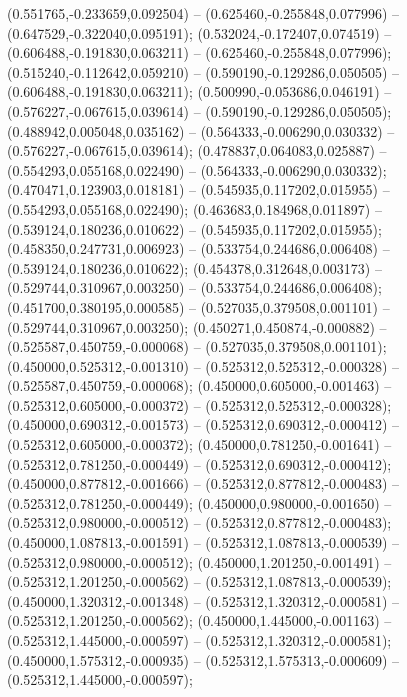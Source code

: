  (0.551765,-0.233659,0.092504) -- (0.625460,-0.255848,0.077996) -- (0.647529,-0.322040,0.095191);
 (0.532024,-0.172407,0.074519) -- (0.606488,-0.191830,0.063211) -- (0.625460,-0.255848,0.077996);
 (0.515240,-0.112642,0.059210) -- (0.590190,-0.129286,0.050505) -- (0.606488,-0.191830,0.063211);
 (0.500990,-0.053686,0.046191) -- (0.576227,-0.067615,0.039614) -- (0.590190,-0.129286,0.050505);
 (0.488942,0.005048,0.035162) -- (0.564333,-0.006290,0.030332) -- (0.576227,-0.067615,0.039614);
 (0.478837,0.064083,0.025887) -- (0.554293,0.055168,0.022490) -- (0.564333,-0.006290,0.030332);
 (0.470471,0.123903,0.018181) -- (0.545935,0.117202,0.015955) -- (0.554293,0.055168,0.022490);
 (0.463683,0.184968,0.011897) -- (0.539124,0.180236,0.010622) -- (0.545935,0.117202,0.015955);
 (0.458350,0.247731,0.006923) -- (0.533754,0.244686,0.006408) -- (0.539124,0.180236,0.010622);
 (0.454378,0.312648,0.003173) -- (0.529744,0.310967,0.003250) -- (0.533754,0.244686,0.006408);
 (0.451700,0.380195,0.000585) -- (0.527035,0.379508,0.001101) -- (0.529744,0.310967,0.003250);
 (0.450271,0.450874,-0.000882) -- (0.525587,0.450759,-0.000068) -- (0.527035,0.379508,0.001101);
 (0.450000,0.525312,-0.001310) -- (0.525312,0.525312,-0.000328) -- (0.525587,0.450759,-0.000068);
 (0.450000,0.605000,-0.001463) -- (0.525312,0.605000,-0.000372) -- (0.525312,0.525312,-0.000328);
 (0.450000,0.690312,-0.001573) -- (0.525312,0.690312,-0.000412) -- (0.525312,0.605000,-0.000372);
 (0.450000,0.781250,-0.001641) -- (0.525312,0.781250,-0.000449) -- (0.525312,0.690312,-0.000412);
 (0.450000,0.877812,-0.001666) -- (0.525312,0.877812,-0.000483) -- (0.525312,0.781250,-0.000449);
 (0.450000,0.980000,-0.001650) -- (0.525312,0.980000,-0.000512) -- (0.525312,0.877812,-0.000483);
 (0.450000,1.087813,-0.001591) -- (0.525312,1.087813,-0.000539) -- (0.525312,0.980000,-0.000512);
 (0.450000,1.201250,-0.001491) -- (0.525312,1.201250,-0.000562) -- (0.525312,1.087813,-0.000539);
 (0.450000,1.320312,-0.001348) -- (0.525312,1.320312,-0.000581) -- (0.525312,1.201250,-0.000562);
 (0.450000,1.445000,-0.001163) -- (0.525312,1.445000,-0.000597) -- (0.525312,1.320312,-0.000581);
 (0.450000,1.575312,-0.000935) -- (0.525312,1.575313,-0.000609) -- (0.525312,1.445000,-0.000597);
